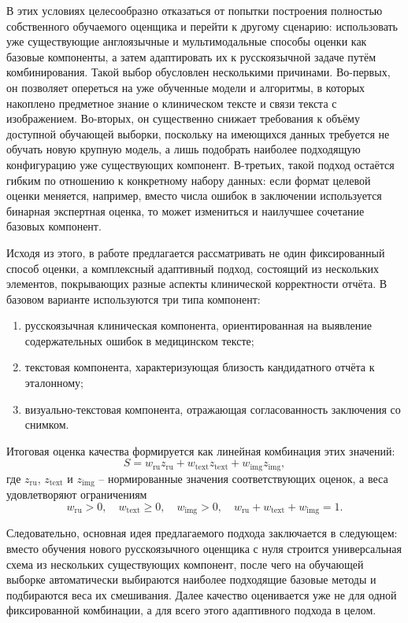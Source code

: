 В этих условиях целесообразно отказаться от попытки построения полностью собственного обучаемого оценщика и перейти к другому сценарию: использовать уже существующие англоязычные и мультимодальные способы оценки как базовые компоненты, а затем адаптировать их к русскоязычной задаче путём комбинирования. Такой выбор обусловлен несколькими причинами. Во-первых, он позволяет опереться на уже обученные модели и алгоритмы, в которых накоплено предметное знание о клиническом тексте и связи текста с изображением. Во-вторых, он существенно снижает требования к объёму доступной обучающей выборки, поскольку на имеющихся данных требуется не обучать новую крупную модель, а лишь подобрать наиболее подходящую конфигурацию уже существующих компонент. В-третьих, такой подход остаётся гибким по отношению к конкретному набору данных: если формат целевой оценки меняется, например, вместо числа ошибок в заключении используется бинарная экспертная оценка, то может измениться и наилучшее сочетание базовых компонент.

Исходя из этого, в работе предлагается рассматривать не один фиксированный способ оценки, а комплексный адаптивный подход, состоящий из нескольких элементов, покрывающих разные аспекты клинической корректности отчёта. В базовом варианте используются три типа компонент:
\begin{enumerate}
    \item русскоязычная клиническая компонента, ориентированная на выявление содержательных ошибок в медицинском тексте;
    \item текстовая компонента, характеризующая близость кандидатного отчёта к эталонному;
    \item визуально-текстовая компонента, отражающая согласованность заключения со снимком.
\end{enumerate}

Итоговая оценка качества формируется как линейная комбинация этих значений:
\[
S = w_{\mathrm{ru}} z_{\mathrm{ru}} + w_{\mathrm{text}} z_{\mathrm{text}} + w_{\mathrm{img}} z_{\mathrm{img}},
\]
где $z_{\mathrm{ru}}$, $z_{\mathrm{text}}$ и $z_{\mathrm{img}}$ -- нормированные значения соответствующих оценок, а веса удовлетворяют ограничениям
\[
w_{\mathrm{ru}} > 0,\quad
w_{\mathrm{text}} \ge 0,\quad
w_{\mathrm{img}} > 0,\quad
w_{\mathrm{ru}} + w_{\mathrm{text}} + w_{\mathrm{img}} = 1.
\]

Следовательно, основная идея предлагаемого подхода заключается в следующем: вместо обучения нового русскоязычного оценщика с нуля строится универсальная схема из нескольких существующих компонент, после чего на обучающей выборке автоматически выбираются наиболее подходящие базовые методы и подбираются веса их смешивания. Далее качество оценивается уже не для одной фиксированной комбинации, а для всего этого адаптивного подхода в целом.

